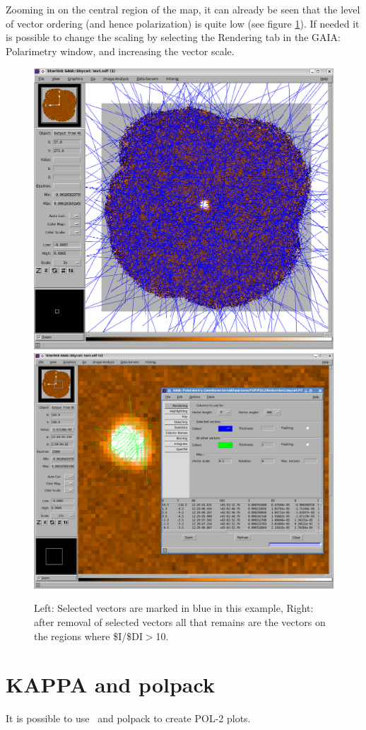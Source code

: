 Zooming in on the central region of the map, it can already be seen that the level of vector ordering
(and hence polarization) is quite low (see figure \ref{fig:gaia-plot-vectors3}). If needed it is
possible to change the scaling by selecting the Rendering tab in the GAIA: Polarimetry
window, and increasing the vector scale.


\begin{figure}[t!]
\begin{center}
\includegraphics[width=0.44\linewidth]{sc22-gaia-plot-vectors-5.png}
\includegraphics[width=0.52\linewidth]{sc22-gaia-plot-vectors-7.png}
\label{fig:gaia-plot-vectors3}
\caption [Over Plotting Vectors in GAIA]{
  \small Left: Selected vectors are marked in blue in this example, Right: after removal of selected
vectors all that remains are the vectors on the regions where \$I/\$DI$>$10.
}
\end{center}
\end{figure}


\section{KAPPA and polpack}

It is possible to use \Kappa\ and polpack to create POL-2 plots.

\begin{terminalv}
\end{terminalv}

